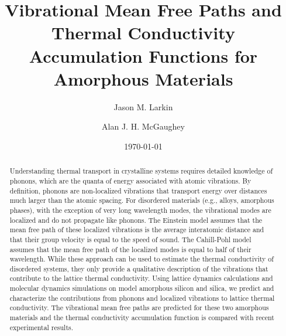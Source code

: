 \documentclass[aps,prb,twocolumn,superscriptaddress,footinbib,amsmath,amssymb,floatfix]{revtex4}
\begin{document}
\title{Vibrational Mean Free Paths and Thermal Conductivity 
Accumulation Functions for Amorphous Materials}
\author{Jason M. Larkin}
\author{Alan J. H. McGaughey}
\date{\today}
\begin{abstract}
Understanding thermal transport in crystalline systems requires detailed 
knowledge of phonons, which are the quanta of energy associated with atomic 
vibrations. By definition, phonons are non-localized vibrations that 
transport energy over distances much larger than the atomic spacing. For 
disordered materials (e.g., alloys, amorphous phases), with the exception 
of very long wavelength modes, the vibrational modes are localized and do 
not propagate like phonons. The Einstein model assumes that the mean free 
path of these localized vibrations is the average interatomic distance and 
that their group velocity is equal to the speed of sound. The Cahill-Pohl 
model assumes that the mean free path of the localized modes is equal to 
half of their wavelength. While these approach can be used to estimate the 
thermal conductivity of disordered systems, they only 
provide a qualitative description of the vibrations that contribute to the 
lattice thermal conductivity.
Using lattice dynamics calculations and molecular dynamics simulations on 
model amorphous silicon and silica, we predict and 
characterize the contributions from phonons and localized vibrations to 
lattice thermal conductivity. The vibrational mean free paths are 
predicted for these two amorphous materials and the thermal 
conductivity accumulation function is compared with recent experimental 
results.

\end{abstract}
\maketitle
\clearpage
\end{document}

